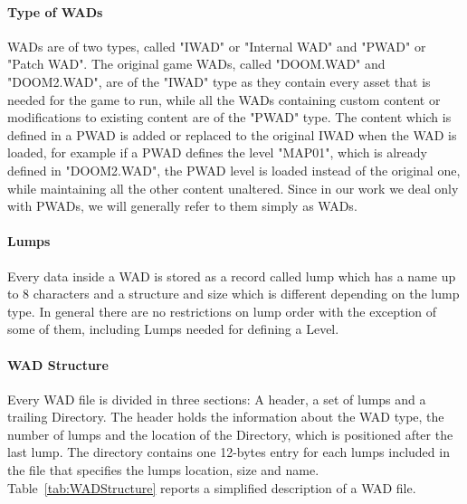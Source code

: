 \paragraph{Type of WADs}
\glspl{WAD} are of two types, called "IWAD" or "Internal WAD" and "PWAD" or "Patch WAD". The original game \glspl{WAD}, called "DOOM.WAD" and "DOOM2.WAD", are of the "IWAD" type as they contain every asset that is needed for the game to run, while all the \glspl{WAD} containing custom content or modifications to existing content are of the "PWAD" type. The content which is defined in a PWAD is added or replaced to the original IWAD when the \gls{WAD} is loaded, for example if a PWAD defines the level "MAP01", which is already defined in "DOOM2.WAD", the PWAD level is loaded instead of the original one, while maintaining all the other content unaltered.
Since in our work we deal only with PWADs, we will generally refer to them simply as \glspl{WAD}.

\paragraph{Lumps} Every data inside a \gls{WAD} is stored as a record called \gls{lump} which has a name up to 8 characters and a structure and size which is different depending on the lump type. In general there are no restrictions on lump order with the exception of some of them, including Lumps needed for defining a Level.

\paragraph{WAD Structure} Every \gls{WAD} file is divided in three sections: A header, a set of \glspl{lump} and a trailing Directory. The header holds the information about the WAD type, the number of \glspl{lump} and the location of the Directory, which is positioned after the last \gls{lump}. The directory contains one 12-bytes entry for each \glspl{lump} included in the file that specifies the \glspl{lump} location, size and name. Table~\ref{tab:WADStructure} reports a simplified description of a \gls{WAD} file.



